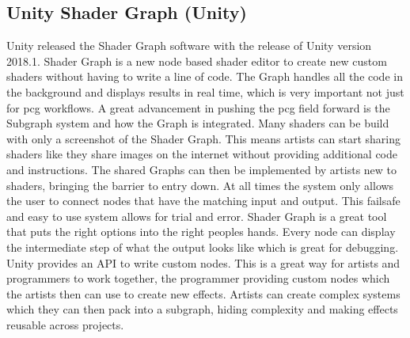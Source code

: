 \documentclass[10pt,a4paper]{article}
\begin{document}
\begin{multicols}{2}
\subsection{Unity Shader Graph (Unity)}
Unity released the Shader Graph software with the release of Unity version 2018.1. Shader Graph is a new node based shader editor to create new custom shaders without having to write a line of code. The Graph handles all the code in the background and displays results in real time, which is very important not just for \gls{pcg} workflows. A great advancement in pushing the \gls{pcg} field forward is the Subgraph system and how the Graph is integrated. Many shaders can be build with only a screenshot of the Shader Graph. This means artists can start sharing shaders like they share images on the internet without providing additional code and instructions. The shared Graphs can then be implemented by artists new to shaders, bringing the barrier to entry down. At all times the system only allows the user to connect nodes that have the matching input and output. This failsafe and easy to use system allows for trial and error. Shader Graph is a great tool that puts the right options into the right peoples hands. Every node can display the intermediate step of what the output looks like which is great for debugging. Unity provides an API to write custom nodes. This is a great way for artists and programmers to work together, the programmer providing custom nodes which the artists then can use to create new effects. Artists can create complex systems which they can then pack into a subgraph, hiding complexity and making effects reusable across projects.
\end{multicols}
\end{document}
